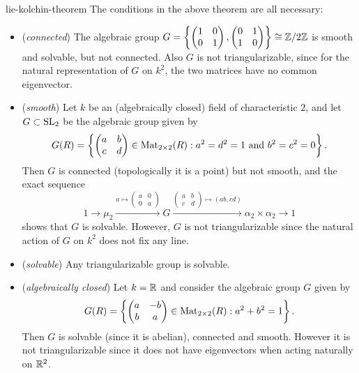 \begin{example}{lie-kolchin-theorem}
    The conditions in the above theorem are all necessary:
    \begin{itemize}
        \item (\textit{connected}) The algebraic group $G = \left\{ \begin{pmatrix} 1 & 0 \\ 0 & 1 \end{pmatrix}, \begin{pmatrix} 0 & 1 \\ 1 & 0 \end{pmatrix} \right\} \cong \mathbb{Z}/2\mathbb{Z}$ is smooth and solvable, but not connected. Also $G$ is not triangularizable, since for the natural representation of $G$ on $k^2$, the two matrices have no common eigenvector.
        \item (\textit{smooth}) Let $k$ be an (algebraically closed) field of characteristic $2$, and let $G \subset \textup{SL}_2$ be the algebraic group given by
        \[ G(R) = \left\{ \begin{pmatrix} a & b \\ c & d \end{pmatrix} \in \textup{Mat}_{2 \times 2}(R) : a^2 = d^2 = 1 \textup{ and } b^2 = c^2 = 0 \right\} . \]
        Then $G$ is connected (topologically it is a point) but not smooth, and the exact sequence
        \[ 1 \to \mu_2 \xrightarrow{a \mapsto \left(\begin{smallmatrix} a & 0 \\ 0 & a \end{smallmatrix}\right)} G \xrightarrow{\left(\begin{smallmatrix} a & b \\ c & d \end{smallmatrix}\right) \mapsto (ab, cd)} \alpha_2 \times \alpha_2 \to 1 \]
        shows that $G$ is solvable. However, $G$ is not triangularizable since the natural action of $G$ on $k^2$ does not fix any line.
        \item (\textit{solvable}) Any triangularizable group is solvable.
        \item (\textit{algebraically closed}) Let $k = \mathbb{R}$ and consider the algebraic group $G$ given by
        \[ G(R) = \left\{ \begin{pmatrix} a & -b \\ b & a \end{pmatrix} \in \textup{Mat}_{2 \times 2}(R) : a^2 + b^2 = 1 \right\} . \]
        Then $G$ is solvable (since it is abelian), connected and smooth. However it is not triangularizable since it does not have eigenvectors when acting naturally on $\mathbb{R}^2$.
    \end{itemize}
\end{example}


